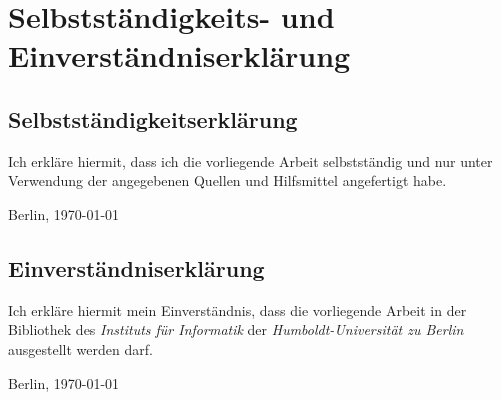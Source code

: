 
\chapter*{Selbstständigkeits- und Einverständniserklärung}

\section*{Selbstständigkeitserklärung}

Ich erkläre hiermit, dass ich die vorliegende Arbeit selbstständig und
nur unter Verwendung der angegebenen Quellen und Hilfsmittel
angefertigt habe.

\vspace*{1.8cm}

Berlin, \today

\section*{Einverständniserklärung}

Ich erkläre hiermit mein Einverständnis, dass die vorliegende Arbeit
in der Bibliothek des \textit{Instituts für Informatik} der
\textit{Humboldt-Universität zu Berlin} ausgestellt werden darf.

\vspace*{1.8cm}

Berlin, \today


